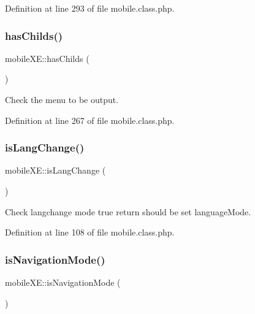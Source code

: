 Definition at line 293 of file mobile.\+class.\+php.

\mbox{\label{classmobileXE_a680f6a6b774bf12be4c67b6a9215f1ea}} 
\subsubsection{\texorpdfstring{has\+Childs()}{hasChilds()}}
{\footnotesize\ttfamily mobile\+X\+E\+::has\+Childs (\begin{DoxyParamCaption}{ }\end{DoxyParamCaption})}



Check the menu to be output. 



Definition at line 267 of file mobile.\+class.\+php.

\mbox{\label{classmobileXE_adc3005704a5d02608a754c208b11c04c}} 
\subsubsection{\texorpdfstring{is\+Lang\+Change()}{isLangChange()}}
{\footnotesize\ttfamily mobile\+X\+E\+::is\+Lang\+Change (\begin{DoxyParamCaption}{ }\end{DoxyParamCaption})}



Check langchange mode true return should be set language\+Mode. 



Definition at line 108 of file mobile.\+class.\+php.

\mbox{\label{classmobileXE_a7adfc4319f2a666887b659f6d01ef4da}} 
\subsubsection{\texorpdfstring{is\+Navigation\+Mode()}{isNavigationMode()}}
{\footnotesize\ttfamily mobile\+X\+E\+::is\+Navigation\+Mode (\begin{DoxyParamCaption}{ }\end{DoxyParamCaption})}



